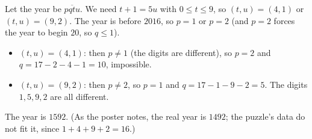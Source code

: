 Let the year be $\overline{pqtu}$. We need $t+1=5u$ with $0\le t\le9$, so $(t,u)=(4,1)$ or $(t,u)=(9,2)$. The year is before $2016$, so $p=1$ or $p=2$ (and $p=2$ forces the year to begin $20$, so $q\le1$).
\begin{itemize}
\item $(t,u)=(4,1)$: then $p\ne1$ (the digits are different), so $p=2$ and $q=17-2-4-1=10$, impossible.
\item $(t,u)=(9,2)$: then $p\ne2$, so $p=1$ and $q=17-1-9-2=5$. The digits $1,5,9,2$ are all different.
\end{itemize}
The year is $\boxed{1592}$. (As the poster notes, the real year is $1492$; the puzzle's data do not fit it, since $1+4+9+2=16$.)
